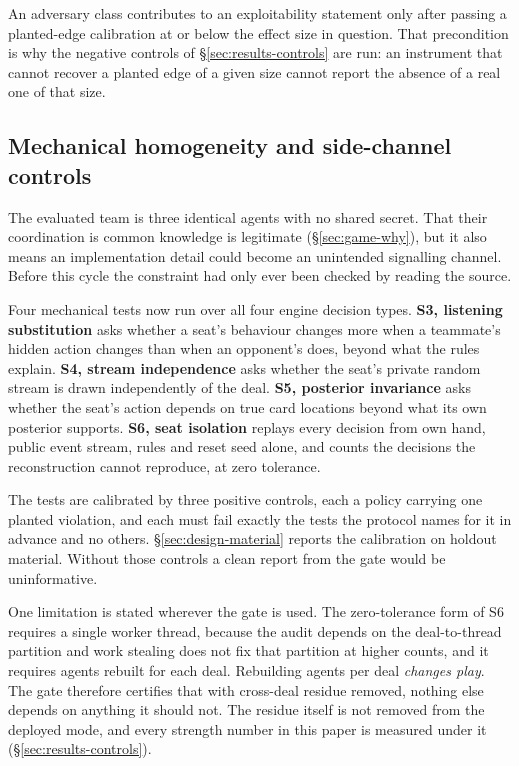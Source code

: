 An adversary class contributes to an exploitability statement only after passing a planted-edge
calibration at or below the effect size in question. That precondition is why the negative controls of
\S\ref{sec:results-controls} are run: an instrument that cannot recover a planted edge of a given size
cannot report the absence of a real one of that size.

\subsection{Mechanical homogeneity and side-channel controls}
\label{sec:evaluation-side}

The evaluated team is three identical agents with no shared secret. That their coordination is common
knowledge is legitimate (\S\ref{sec:game-why}), but it also means an implementation detail could
become an unintended signalling channel. Before this cycle the constraint had only ever been checked
by reading the source.

Four mechanical tests now run over all four engine decision types. \textbf{S3, listening
substitution} asks whether a seat's behaviour changes more when a teammate's hidden action changes
than when an opponent's does, beyond what the rules explain. \textbf{S4, stream independence} asks
whether the seat's private random stream is drawn independently of the deal. \textbf{S5, posterior
invariance} asks whether the seat's action depends on true card locations beyond what its own
posterior supports. \textbf{S6, seat isolation} replays every decision from own hand, public event
stream, rules and reset seed alone, and counts the decisions the reconstruction cannot reproduce, at
zero tolerance.

The tests are calibrated by three positive controls, each a policy carrying one planted violation,
and each must fail exactly the tests the protocol names for it in advance and no others.
\S\ref{sec:design-material} reports the calibration on holdout material. Without those controls a
clean report from the gate would be uninformative.

One limitation is stated wherever the gate is used. The zero-tolerance form of S6 requires a single
worker thread, because the audit depends on the deal-to-thread partition and work stealing does not
fix that partition at higher counts, and it requires agents rebuilt for each deal. Rebuilding agents
per deal \emph{changes play}. The gate therefore certifies that with cross-deal residue removed,
nothing else depends on anything it should not. The residue itself is not removed from the deployed
mode, and every strength number in this paper is measured under it
(\S\ref{sec:results-controls}).

